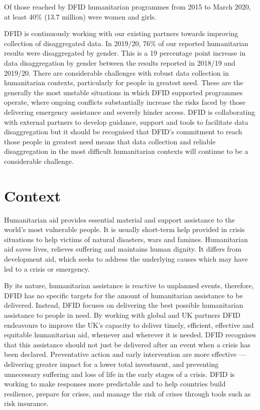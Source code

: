 Of those reached by DFID humanitarian programmes from 2015 to March 2020, at least
40\% (13.7
million) were women and girls. %

DFID is continuously working with our existing partners towards improving collection of disaggregated data. %
In 2019/20, 76\% of our reported humanitarian results were disaggregated by gender. %
This is a 19 percentage point increase in data disaggregation by gender between the results reported in 2018/19 and 2019/20. %
There are considerable challenges with robust data collection in humanitarian contexts, particularly for people in greatest need. %
These are the generally the most unstable situations in which DFID supported programmes operate, where ongoing conflicts substantially increase the risks faced by those delivering emergency assistance and severely hinder access. %
DFID is collaborating with external partners to develop guidance, support and tools to facilitate data disaggregation but it should be recognised that DFID's commitment to reach those people in greatest need means that data collection and reliable disaggregation in the most difficult humanitarian contexts will continue to be a considerable challenge. %


\section{Context}

Humanitarian aid provides essential material and support assistance to the world's most vulnerable people. %
It is usually short-term help provided in crisis situations to help victims of natural disasters, wars and famines. %
Humanitarian aid saves lives, relieves suffering and maintains human dignity. %
It differs from development aid, which seeks to address the underlying causes which may have led to a crisis or emergency. %

By its nature, humanitarian assistance is reactive to unplanned events, therefore, DFID has no specific targets for the amount of humanitarian assistance to be delivered. %
Instead, DFID focuses on delivering the best possible humanitarian assistance to people in need. %
By working with global and UK partners DFID endeavours to improve the UK's capacity to deliver timely, efficient, effective and equitable humanitarian aid, whenever and wherever it is needed. %
DFID recognises that this assistance should not just be delivered after an event when a crisis has been declared. %
Preventative action and early intervention are more effective --- delivering greater impact for a lower total investment, and preventing unnecessary suffering and loss of life in the early stages of a crisis. %
DFID is working to make responses more predictable and to help countries build resilience, prepare for crises, and manage the risk of crises through tools such as risk insurance. %

